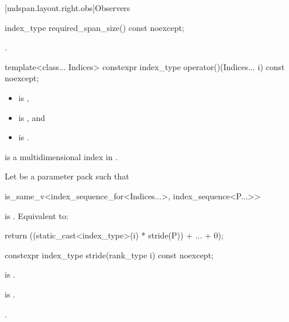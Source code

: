[mdspan.layout.right.obs]{Observers}

%
\begin{itemdecl}
index_type required_span_size() const noexcept;
\end{itemdecl}

\begin{itemdescr}
\pnum
\returns
{}.
\end{itemdescr}

%
\begin{itemdecl}
template<class... Indices>
  constexpr index_type operator()(Indices... i) const noexcept;
\end{itemdecl}

\begin{itemdescr}
\pnum
\constraints
\begin{itemize}
\item
{} is ,
\item
{} is , and
\item
{} is
.
\end{itemize}

\pnum
\expects
{} is
a multidimensional index in .

\pnum
\effects
Let  be a parameter pack such that
\begin{codeblock}
is_same_v<index_sequence_for<Indices...>, index_sequence<P...>>
\end{codeblock}
is . Equivalent to:
\begin{codeblock}
return ((static_cast<index_type>(i) * stride(P)) + ... + 0);
\end{codeblock}
\end{itemdescr}

%
\begin{itemdecl}
constexpr index_type stride(rank_type i) const noexcept;
\end{itemdecl}

\begin{itemdescr}
\pnum
\constraints
{} is .

\pnum
\expects
{} is .

\pnum
\returns
{}.
\end{itemdescr}

